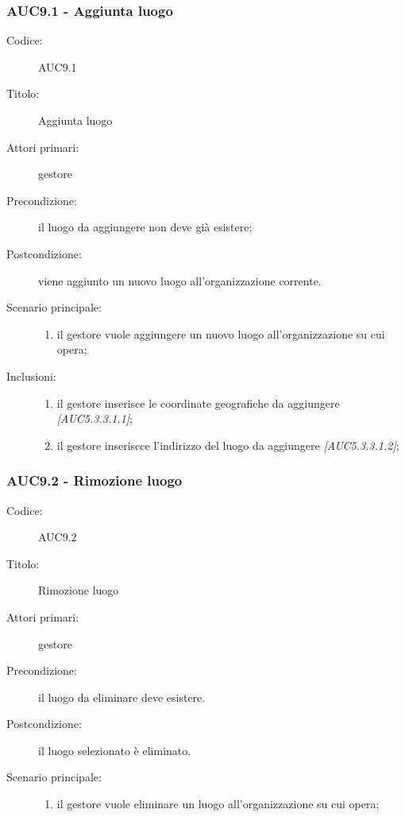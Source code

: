 \documentclass[../../../analisi-dei-requisiti.tex]{subfiles}
\begin{document}
\subsubsection{AUC9.1 - Aggiunta luogo}%
\label{subs:AUC9.1}
\begin{description}
  \item[Codice:] AUC9.1
  \item[Titolo:] Aggiunta luogo
  \item[Attori primari:] gestore
  \item[Precondizione:] il luogo da aggiungere non deve già esistere;
  \item[Postcondizione:] viene aggiunto un nuovo luogo all'organizzazione corrente.
  \item[Scenario principale:]
  \begin{enumerate}
    \item il gestore vuole aggiungere un nuovo luogo all'organizzazione su cui opera;
  \end{enumerate}
  \item[Inclusioni:]
  \begin{enumerate}
    \item il gestore inserisce le coordinate geografiche da aggiungere \emph{[AUC5.3.3.1.1]};
    \item il gestore inseriscce l'indirizzo del luogo da aggiungere \emph{[AUC5.3.3.1.2]};
  \end{enumerate}
\end{description}

\subsubsection{AUC9.2 - Rimozione luogo}%
\label{subs:AUC9.2}
\begin{description}
  \item[Codice:] AUC9.2
  \item[Titolo:] Rimozione luogo
  \item[Attori primari:] gestore
  \item[Precondizione:] il luogo da eliminare deve esistere.
  \item[Postcondizione:] il luogo selezionato è eliminato.
  \item[Scenario principale:]
  \begin{enumerate}
    \item il gestore vuole eliminare un luogo all'organizzazione su cui opera;
  \end{enumerate}
\end{description}
\end{document}
